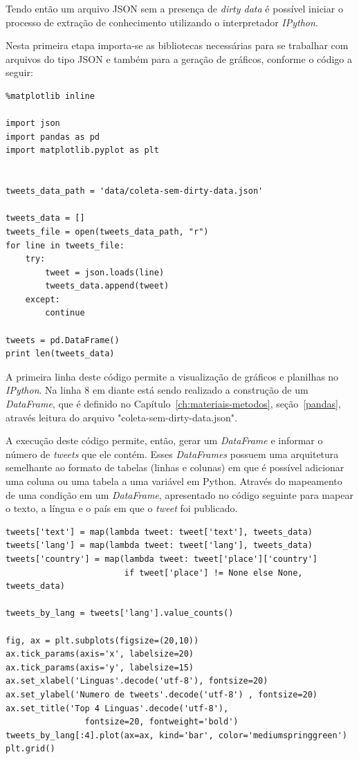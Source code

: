 Tendo então um arquivo JSON sem a presença de \textit{dirty data} é possível iniciar o processo de extração de conhecimento utilizando o interpretador \textit{IPython}.

Nesta primeira etapa importa-se as bibliotecas necessárias para se trabalhar com arquivos do tipo JSON e também para a geração de gráficos, conforme o código a seguir: \\

\begin{lstlisting}
%matplotlib inline

import json
import pandas as pd
import matplotlib.pyplot as plt


tweets_data_path = 'data/coleta-sem-dirty-data.json'

tweets_data = []
tweets_file = open(tweets_data_path, "r")
for line in tweets_file:
    try:
        tweet = json.loads(line)
        tweets_data.append(tweet)
    except:
        continue

tweets = pd.DataFrame()
print len(tweets_data)
\end{lstlisting}

A primeira linha deste código permite a visualização de gráficos e planilhas no \textit{IPython}. Na linha 8 em diante está sendo realizado a construção de um \textit{DataFrame}, que é definido no Capítulo~\ref{ch:materiais-metodos}, seção~\ref{pandas}, através leitura do arquivo "coleta-sem-dirty-data.json".

A execução deste código permite, então, gerar um \textit{DataFrame} e informar o número de \textit{tweets} que ele contém. Esses \textit{DataFrames} possuem uma arquitetura semelhante ao formato de tabelas (linhas e colunas) em que é possível adicionar uma coluna ou uma tabela a uma variável em Python. Através do mapeamento de uma condição em um \textit{DataFrame}, apresentado no código seguinte para mapear o texto, a língua e o país em que o \textit{tweet} foi publicado. \\

\begin{lstlisting}
tweets['text'] = map(lambda tweet: tweet['text'], tweets_data)
tweets['lang'] = map(lambda tweet: tweet['lang'], tweets_data)
tweets['country'] = map(lambda tweet: tweet['place']['country']
						if tweet['place'] != None else None, tweets_data)

tweets_by_lang = tweets['lang'].value_counts()

fig, ax = plt.subplots(figsize=(20,10))
ax.tick_params(axis='x', labelsize=20)
ax.tick_params(axis='y', labelsize=15)
ax.set_xlabel('Linguas'.decode('utf-8'), fontsize=20)
ax.set_ylabel('Numero de tweets'.decode('utf-8') , fontsize=20)
ax.set_title('Top 4 Linguas'.decode('utf-8'),
				fontsize=20, fontweight='bold')
tweets_by_lang[:4].plot(ax=ax, kind='bar', color='mediumspringgreen')
plt.grid()
\end{lstlisting}

